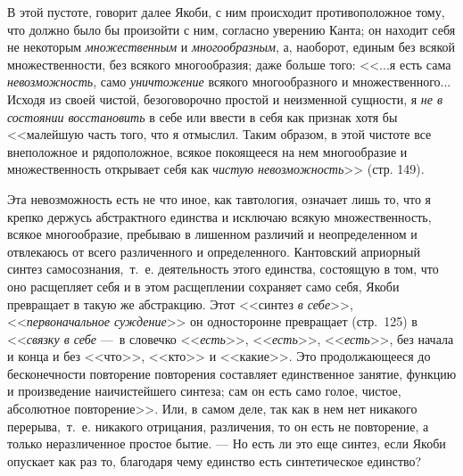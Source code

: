 В этой пустоте, говорит далее Якоби, с ним происходит противоположное тому,
что должно было бы произойти с ним, согласно уверению Канта; он находит
себя не некоторым {\em множественным} и
{\em многообразным}, а, наоборот, единым без всякой
множественности, без всякого многообразия; даже больше того: <<...я есть
сама {\em невозможность}, само
{\em уничтожение} всякого многообразного и
множественного... Исходя из своей чистой, безоговорочно простой и
неизменной сущности, я {\em не в состоянии
восстановить} в себе или ввести в себя как признак хотя бы <<малейшую часть
того, что я отмыслил. Таким образом, в этой чистоте все внеположное и
рядоположное, всякое покоящееся на нем многообразие и множественность
открывает себя как {\em чистую невозможность}>> (стр.
149).

Эта невозможность есть не что иное, как тавтология, означает лишь то, что я
крепко держусь абстрактного единства и исключаю всякую множественность,
всякое многообразие, пребываю в лишенном различий и неопределенном и
отвлекаюсь от всего различенного и определенного. Кантовский априорный
синтез самосознания,~т.~е. деятельность этого единства, состоящую в том,
что оно расщепляет себя и в этом расщеплении сохраняет само себя, Якоби
превращает в такую же абстракцию. Этот <<синтез {\em в
себе}>>, <<{\em первоначальное суждение}>> он односторонне
превращает (стр.~125) в
<<{\em связку в себе} ---~в словечко
<<{\em есть}>>, <<{\em есть}>>,
<<{\em есть}>>, без начала и конца и без <<что>>, <<кто>> и
<<какие>>. Это продолжающееся до бесконечности повторение повторения
составляет единственное занятие, функцию и произведение наичистейшего
синтеза; сам он есть само голое, чистое, абсолютное повторение>>. Или, в
самом деле, так как в нем нет никакого перерыва,~т.~е. никакого отрицания,
различения, то он есть не повторение, а только неразличенное простое бытие.
--- Но есть ли это еще синтез, если Якоби опускает как раз то, благодаря чему
единство есть синтетическое единство?


